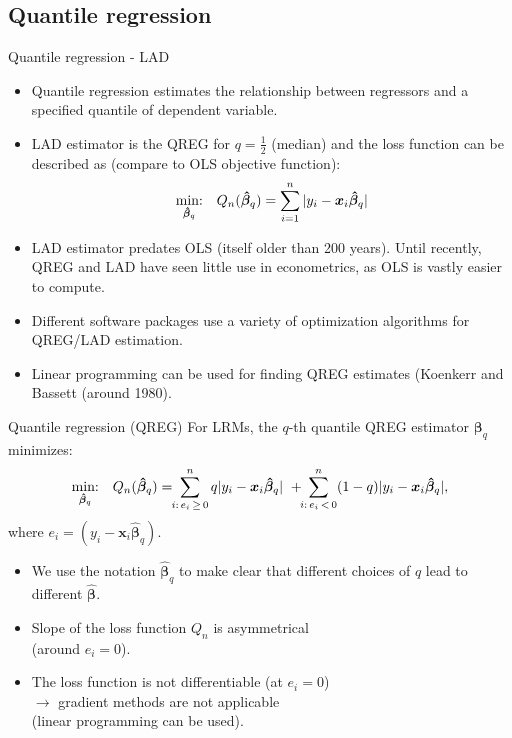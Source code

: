 \documentclass{beamer}
\begin{document}
\subsection{Quantile regression}
\begin{frame}{Quantile regression - LAD}
\begin{itemize}
\item Quantile regression estimates the relationship between regressors and a specified quantile of dependent variable.
\smallskip
\item LAD estimator is the QREG for $q=\tfrac{1}{2}$ (median) and the loss function can be described as (compare to OLS objective function): $$
\underset{\bm{\hat{\beta}}_{q}}{\textnormal{min:}} \quad Q_n(\bm{\hat{\beta}}_{q}) =
\sum_{i=1}^n |y_i-\bm{x}_i\bm{\hat{\beta}}_{q}|
$$
\item LAD estimator predates OLS (itself older than 200 years). Until recently, QREG and LAD have seen little use in econometrics, as OLS is vastly easier to compute.
\item Different software packages use a variety of optimization algorithms for QREG/LAD estimation.
\item Linear programming can be used for finding QREG estimates (Koenkerr and Bassett (around 1980).
\end{itemize}
\end{frame}
\begin{frame}{Quantile regression (QREG)}
For LRMs, the $q$-th quantile QREG estimator $\bm{\beta}_q$ minimizes:
$$
\underset{\bm{\hat{\beta}}_q}{\textnormal{min:}} \quad Q_n(\bm{\hat{\beta}}_q) =
\! \! \sum^n_{i:\, e_i \, \geq \, 0} q|y_i - \bm{x}_i\bm{\hat{\beta}}_q| \,\, +
\! \! \sum^n_{i:\, e_i\, < \, 0} (1-q)|y_i - \bm{x}_i\bm{\hat{\beta}}_q|,
$$
where $e_i = (y_i - \bm{x}_i\bm{\hat{\beta}}_q)$.

\begin{itemize}
    \item We use the notation $\bm{\hat{\beta}}_q$ to make clear that different choices of $q$ lead to different  $\bm{\hat{\beta}}$.
    \item Slope of the loss function $Q_n$ is asymmetrical \\(around $e_i=0$).
    \item The loss function is not differentiable (at $e_i=0$) \\$\rightarrow$ gradient methods are not applicable \\(linear programming can be used).
\end{itemize}
\end{frame}
\end{document}
